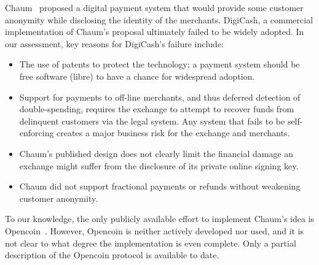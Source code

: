 \documentclass[sigconf, authordraft]{acmart}
\begin{document}
Chaum~\cite{chaum1983blind} proposed a digital payment system that
would provide some customer anonymity while disclosing the identity of
the merchants.  DigiCash, a commercial implementation of Chaum's
proposal ultimately failed to be widely adopted.  In our assessment,
key reasons for DigiCash's failure include:

\begin{itemize}
 \item The use of patents to protect the technology; a payment system
   should be free software (libre) to have a chance for widespread adoption.
 \item Support for payments to off-line merchants, and thus deferred
   detection of double-spending, requires the exchange to attempt to
   recover funds from delinquent customers via the legal system.
   Any system that fails to be self-enforcing creates a major
   business risk for the exchange and merchants.
 \item %
   Chaum's published design does not clearly
   limit the financial damage an exchange might suffer from the
   disclosure of its private online signing key.
 \item Chaum did not support fractional payments or refunds without
   weakening customer anonymity.
\end{itemize}

To our knowledge, the only publicly available effort to implement
Chaum's idea is Opencoin~\cite{dent2008extensions}.  However, Opencoin
is neither actively developed nor used, and it is not clear
to what degree the implementation is even complete.  Only a partial
description of the Opencoin protocol is available to date.
\end{document}
